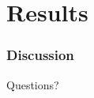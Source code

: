 \documentclass{beamer}
\begin{document}
\section{Results}

%  
%
%

\begin{frame}
  \frametitle{Discussion}
Questions?
\end{frame}
\end{document}
